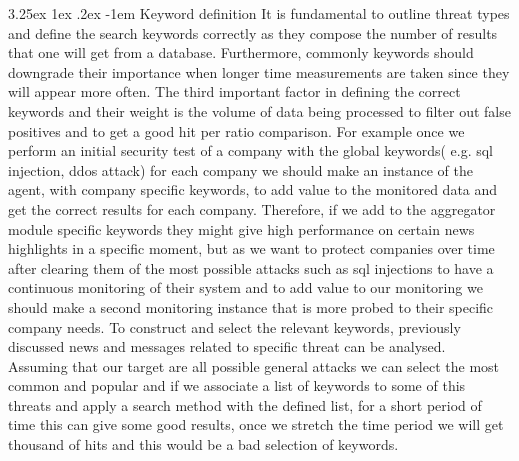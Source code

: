 \documentclass[12pt]{article}
\makeatletter
\renewcommand\paragraph{\@startsection{paragraph}{5}{\z@}%
  {3.25ex \@plus1ex \@minus.2ex}%
  {-1em}%
  {\normalfont\normalsize\bfseries}}
\makeatother
\begin{document}
\paragraph{Keyword definition}
It is fundamental to outline threat types and define the search keywords correctly as they compose the number of results that one will get from a database. Furthermore, commonly keywords should downgrade their importance when longer time measurements are taken since they will appear more often. The third important factor in defining the correct keywords and their weight is the volume of data being processed to filter out false positives and to get a good hit per ratio comparison. For example once we perform an initial security test of a company with the global keywords( e.g. sql injection, ddos attack) for each company we should make an instance of the agent, with company specific keywords, to add value to the monitored data and get the correct results for each company. Therefore, if we add to the aggregator module specific keywords they might give high performance on certain news highlights in a specific moment, but as we want to protect companies over time after clearing them of the most possible attacks such as sql injections to have a continuous monitoring of their system and to add value to our monitoring we should make a second monitoring instance that is more probed to their specific company needs. To construct and select the relevant keywords, previously discussed news \cite{list-2015-attacks} and messages related to specific threat can be analysed. 
\hfill \break \\
Assuming that our target are all possible general attacks we can select the most common and popular \cite{owasp} and if we associate a list of keywords to some of this threats and apply a search method with the defined list, for a short period of time this can give some good results, once we stretch the time period we will get thousand of hits and this would be a bad selection of keywords.\\
\end{document}
